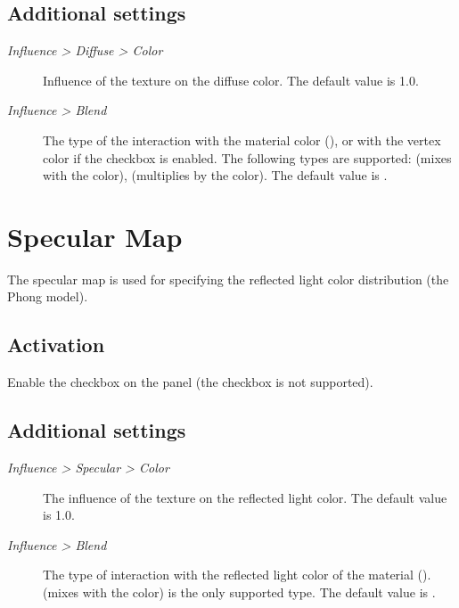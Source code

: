 \documentclass[a4paper,12pt,oneside]{sphinxmanual}
\begin{document}
\subsection{Additional settings}
\label{textures:id5}\begin{description}
\item[{\emph{Influence \textgreater{} Diffuse \textgreater{} Color}}] \leavevmode
Influence of the texture on the diffuse color. The default value is 1.0.

\item[{\emph{Influence \textgreater{} Blend}}] \leavevmode
The type of the interaction with the material color (), or with the vertex color if the  checkbox is enabled. The following types are supported:  (mixes with the color),  (multiplies by the color). The default value is .

\end{description}


\section{Specular Map}
\label{textures:index-5}\label{textures:specular-map}
The specular map is used for specifying the reflected light color distribution (the Phong model).


\subsection{Activation}
\label{textures:id6}
Enable the  checkbox on the  panel (the  checkbox is not supported).


\subsection{Additional settings}
\label{textures:id7}\begin{description}
\item[{\emph{Influence \textgreater{} Specular \textgreater{} Color}}] \leavevmode
The influence of the texture on the reflected light color. The default value is 1.0.

\item[{\emph{Influence \textgreater{} Blend}}] \leavevmode
The type of interaction with the reflected light color of the material ().  (mixes with the color) is the only supported type. The default value is .

\end{description}
\end{document}
